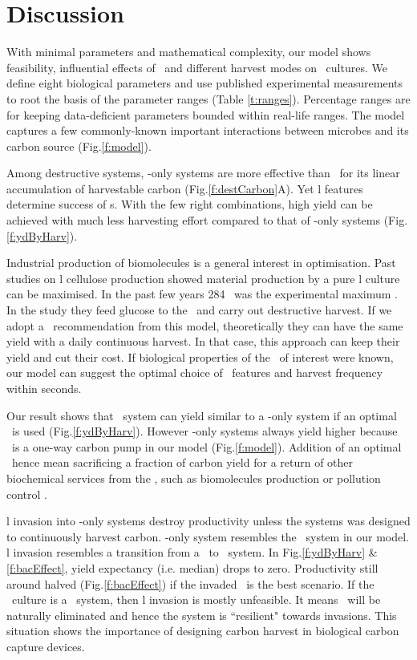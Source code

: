 \documentclass[../thesis.tex]{subfiles} %
\begin{document}
\section{Discussion}
With minimal parameters and mathematical complexity, our model shows feasibility, influential effects of \bac\ and different harvest modes on \phy\ cultures.  We define eight biological parameters and use published experimental measurements to root the basis of the parameter ranges (Table \ref{t:ranges}).  Percentage ranges are for keeping data-deficient parameters bounded within real-life ranges.  The model captures a few commonly-known important interactions between microbes and its carbon source (Fig.\ref{f:model}).

Among destructive systems, \phy-only systems are more effective than \pbs\ for its linear accumulation of harvestable carbon (Fig.\ref{f:destCarbon}A).  Yet \bac l features determine success of \pbs s.  With the few right combinations, high yield can be achieved with much less harvesting effort compared to that of \phy-only systems (Fig.\ref{f:ydByHarv}).

Industrial production of biomolecules is a general interest in optimisation.  Past studies on \bac l cellulose production showed material production by a pure \bac l culture can be maximised.  In the past few years 284 \dxdt\ was the experimental maximum \autocite{aytekin2016statistical}.  In the study they feed glucose to the \bac\ and carry out destructive harvest.  If we adopt a \phy\ recommendation from this model, theoretically they can have the same yield with a daily continuous harvest.  In that case, this approach can keep their yield and cut their cost.  If biological properties of the \bac\ of interest were known, our model can suggest the optimal choice of \phy\ features and harvest frequency within seconds.

Our result shows that \PBH\ system can yield similar to a \phy-only system if an optimal \bac\ is used (Fig.\ref{f:ydByHarv}).  However \phy-only systems always yield higher because \phy\ is a one-way carbon pump in our model (Fig.\ref{f:model}).  Addition of an optimal \bac\ hence mean sacrificing a fraction of carbon yield for a return of other biochemical services from the \bac, such as biomolecules production \autocite{aytekin2016statistical} or pollution control \autocite{dash2013marine,naik2013lead}.

\Bac l invasion into \phy-only systems destroy productivity unless the systems was designed to continuously harvest carbon.  \Phy-only system resembles the \PoN\ system in our model.  \Bac l invasion resembles a transition from a \PoN\ to \PBN\ system.  In Fig.\ref{f:ydByHarv} \& \ref{f:bacEffect}, yield expectancy (i.e. median) drops to zero.  Productivity still around halved (Fig.\ref{f:bacEffect}) if the invaded \bac\ is the best scenario.  If the \phy\ culture is a \PoH\ system, then \bac l invasion is mostly unfeasible.  It means \bac\ will be naturally eliminated and hence the system is ``resilient" towards invasions.  This situation shows the importance of designing carbon harvest in biological carbon capture devices.
\end{document}
